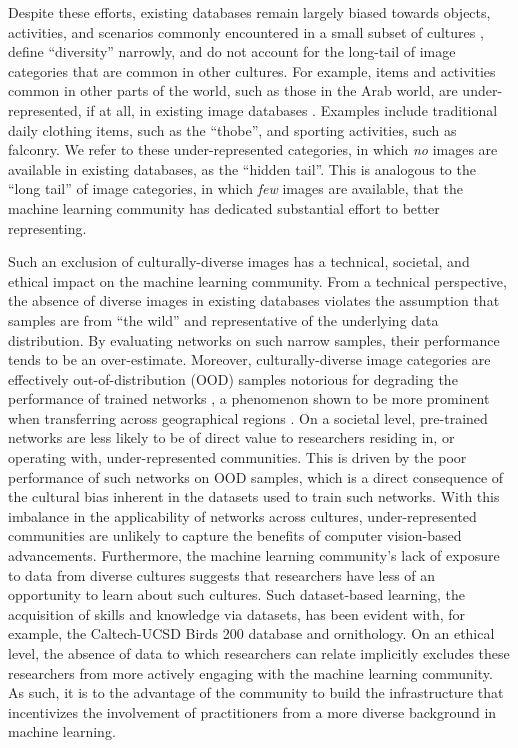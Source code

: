 \documentclass{article}
\begin{document}
Despite these efforts, existing databases remain largely biased towards objects, activities, and scenarios commonly encountered in a small subset of cultures \cite{Birhane2021}, define \enquote{diversity} narrowly, and do not account for the long-tail of image categories that are common in other cultures. For example, items and activities common in other parts of the world, such as those in the Arab world, are under-represented, if at all, in existing image databases \cite{Yang2020}. Examples include traditional daily clothing items, such as the \enquote{thobe}, and sporting activities, such as falconry. We refer to these under-represented categories, in which \textit{no} images are available in existing databases, as the \enquote{hidden tail}. This is analogous to the \enquote{long tail} of image categories, in which \textit{few} images are available, that the machine learning community has dedicated substantial effort to better representing. 

Such an exclusion of culturally-diverse images has a technical, societal, and ethical impact on the machine learning community. From a technical perspective, the absence of diverse images in existing databases violates the assumption that samples are from \enquote{the wild} and representative of the underlying data distribution. By evaluating networks on such narrow samples, their performance tends to be an over-estimate. Moreover, culturally-diverse image categories are effectively out-of-distribution (OOD) samples notorious for degrading the performance of trained networks \cite{Hendrycks2019Adversarial}, a phenomenon shown to be more prominent when transferring across geographical regions \cite{Hendrycks2020OOD}. On a societal level, pre-trained networks are less likely to be of direct value to researchers residing in, or operating with, under-represented communities. This is driven by the poor performance of such networks on OOD samples, which is a direct consequence of the cultural bias inherent in the datasets used to train such networks. With this imbalance in the applicability of networks across cultures, under-represented communities are unlikely to capture the benefits of computer vision-based advancements. Furthermore, the machine learning community's lack of exposure to data from diverse cultures suggests that researchers have less of an opportunity to learn about such cultures. Such dataset-based learning, the acquisition of skills and knowledge via datasets, has been evident with, for example, the Caltech-UCSD Birds 200 database \cite{Wah2011} and ornithology. On an ethical level, the absence of data to which researchers can relate implicitly excludes these researchers from more actively engaging with the machine learning community. As such, it is to the advantage of the community to build the infrastructure that incentivizes the involvement of practitioners from a more diverse background in machine learning. 
\end{document}
